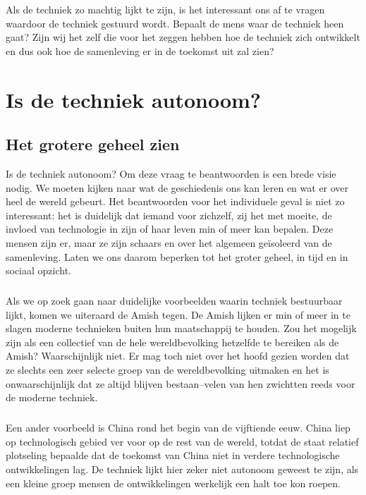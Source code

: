 \documentclass[11pt]{report}
\begin{document}
Als de techniek zo machtig lijkt te zijn, is het interessant ons af te vragen waardoor de techniek gestuurd wordt. Bepaalt de mens waar de techniek heen gaat? Zijn wij het zelf die voor het zeggen hebben hoe de techniek zich ontwikkelt en dus ook hoe de samenleving er in de toekomst uit zal zien?



\chapter{Is de techniek autonoom?}


\section{Het grotere geheel zien}

Is de techniek autonoom? Om deze vraag te beantwoorden is een brede visie nodig. We moeten kijken naar wat de geschiedenis ons kan leren en wat er over heel de wereld gebeurt. Het beantwoorden voor het individuele geval is niet zo interessant: het is duidelijk dat iemand voor zichzelf, zij het met moeite, de invloed van technologie in zijn of haar leven min of meer kan bepalen. Deze mensen zijn er, maar ze zijn schaars en over het algemeen ge\"isoleerd van de samenleving. Laten we ons daarom beperken tot het groter geheel, in tijd en in sociaal opzicht.

\paragraph{}

Als we op zoek gaan naar duidelijke voorbeelden waarin techniek bestuurbaar lijkt, komen we uiteraard de Amish tegen. De Amish lijken er min of meer in te slagen moderne technieken buiten hun maatschappij te houden. Zou het mogelijk zijn als een collectief van de hele wereldbevolking hetzelfde te bereiken als de Amish? Waarschijnlijk niet. Er mag toch niet over het hoofd gezien worden dat ze slechts een zeer selecte groep van de wereldbevolking uitmaken en het is onwaarschijnlijk dat ze altijd blijven bestaan--velen van hen zwichtten reeds voor de moderne techniek.

\paragraph{}

Een ander voorbeeld is China rond het begin van de vijftiende eeuw. China liep op technologisch gebied ver voor op de rest van de wereld, totdat de staat relatief plotseling bepaalde dat de toekomst van China niet in verdere technologische ontwikkelingen lag. De techniek lijkt hier zeker niet autonoom geweest te zijn, als een kleine groep mensen de ontwikkelingen werkelijk een halt toe kon roepen.
\end{document}
